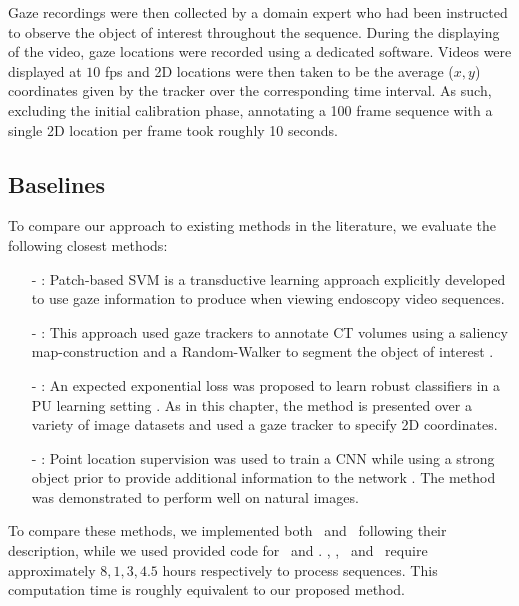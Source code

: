 Gaze recordings were then collected by a domain expert who had been instructed to observe the object of interest throughout the sequence. During the displaying of the video, gaze locations were recorded using a dedicated software. Videos were displayed at $10$ fps and 2D locations were then taken to be the average ($x,y$) coordinates given by the tracker over the corresponding time interval. As such, excluding the initial calibration phase, annotating a 100 frame sequence with a single 2D location per frame took roughly 10 seconds. 

\subsection{Baselines}
To compare our approach to existing methods in the literature, we evaluate the following closest methods:

\begin{itemize}
\item[-]{\PSVM :} Patch-based SVM
is a transductive learning approach \cite{vilarino07} explicitly developed to use gaze information to produce  when viewing endoscopy video sequences.

\item[-]{\GS :} This approach used gaze trackers to annotate CT volumes using a saliency map-construction and a Random-Walker to segment the object of interest \cite{khosravan16}.

\item[-]{\EEL :} An expected exponential loss was proposed to learn robust classifiers in a PU learning setting \cite{lejeune17}. As in this chapter, the method is presented over a variety of image datasets and used a gaze tracker to specify 2D coordinates.

\item[-]{\DL :} Point location supervision was used to train a CNN while using a strong object prior to provide additional information to the network \cite{bearman16}. The method was demonstrated to perform well on natural images.
\end{itemize}

To compare these methods, we implemented both \PSVM ~and \GS ~following their description, while we used provided code for \EEL ~and \DL . \PSVM, \GS, \EEL ~and \DL ~require approximately $8, 1, 3, 4.5$ hours respectively to process sequences. This computation time is roughly equivalent to our proposed method.

